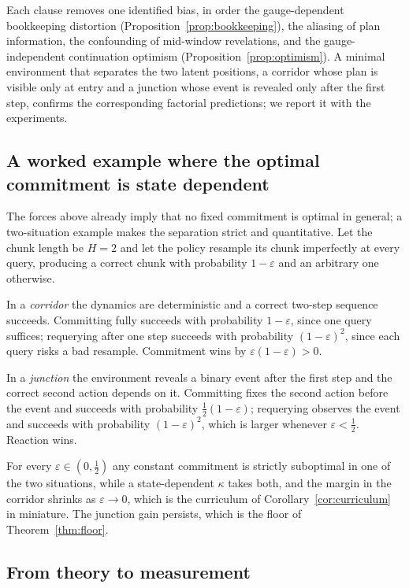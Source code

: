 Each clause removes one identified bias, in order the gauge-dependent bookkeeping distortion
(Proposition~\ref{prop:bookkeeping}), the aliasing of plan information, the confounding of
mid-window revelations, and the gauge-independent continuation optimism
(Proposition~\ref{prop:optimism}). A minimal environment that separates the two latent positions,
a corridor whose plan is visible only at entry and a junction whose event is revealed only after
the first step, confirms the corresponding factorial predictions; we report it with the
experiments.

\subsection{A worked example where the optimal commitment is state dependent}
\label{app:example}

The forces above already imply that no fixed commitment is optimal in general; a two-situation
example makes the separation strict and quantitative. Let the chunk length be $H=2$ and let the
policy resample its chunk imperfectly at every query, producing a correct chunk with probability
$1-\varepsilon$ and an arbitrary one otherwise.

In a \emph{corridor} the dynamics are deterministic and a correct two-step sequence succeeds.
Committing fully succeeds with probability $1-\varepsilon$, since one query suffices; requerying
after one step succeeds with probability $(1-\varepsilon)^{2}$, since each query risks a bad
resample. Commitment wins by $\varepsilon(1-\varepsilon)>0$.

In a \emph{junction} the environment reveals a binary event after the first step and the correct
second action depends on it. Committing fixes the second action before the event and succeeds with
probability $\tfrac12(1-\varepsilon)$; requerying observes the event and succeeds with probability
$(1-\varepsilon)^{2}$, which is larger whenever $\varepsilon<\tfrac12$. Reaction wins.

For every $\varepsilon\in(0,\tfrac12)$ any constant commitment is strictly suboptimal in one of
the two situations, while a state-dependent $\kappa$ takes both, and the margin in the corridor
shrinks as $\varepsilon\to0$, which is the curriculum of Corollary~\ref{cor:curriculum} in
miniature. The junction gain persists, which is the floor of Theorem~\ref{thm:floor}.

\subsection{From theory to measurement}
\label{app:predictions}


